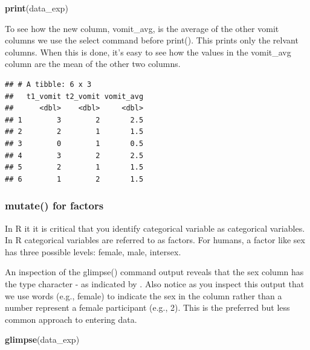 \documentclass[
]{krantz}
\makeatletter
\newenvironment{Shaded}{\begin{snugshade}}{\end{snugshade}}
\newcommand{\KeywordTok}[1]{\textcolor[rgb]{0.27,0.27,0.27}{\textbf{#1}}}
\newcommand{\NormalTok}[1]{#1}
\newcommand{\OperatorTok}[1]{\textcolor[rgb]{0.43,0.43,0.43}{\textbf{#1}}}
\newcommand{\StringTok}[1]{\textcolor[rgb]{0.5,0.5,0.5}{#1}}
\newenvironment{kframe}{%
\medskip{}
\setlength{\fboxsep}{.8em}
 \def\at@end@of@kframe{}%
 \ifinner\ifhmode%
  \def\at@end@of@kframe{\end{minipage}}%
  \begin{minipage}{\columnwidth}%
 \fi\fi%
 \def\FrameCommand##1{\hskip\@totalleftmargin \hskip-\fboxsep
 \colorbox{shadecolor}{##1}\hskip-\fboxsep
     \hskip-\linewidth \hskip-\@totalleftmargin \hskip\columnwidth}%
 \MakeFramed {\advance\hsize-\width
   \@totalleftmargin\z@ \linewidth\hsize
   \@setminipage}}%
 {\par\unskip\endMakeFramed%
 \at@end@of@kframe}
\renewenvironment{Shaded}{\begin{kframe}}{\end{kframe}}
\makeatother
\begin{document}
\begin{Shaded}
\begin{Highlighting}[]
\KeywordTok{print}\NormalTok{(data_exp)}
\end{Highlighting}
\end{Shaded}

To see how the new column, vomit\_avg, is the average of the other vomit columns we use the select command before print(). This prints only the relvant columns. When this is done, it's easy to see how the values in the vomit\_avg column are the mean of the other two columns.

\begin{Shaded}
\end{Shaded}

\begin{verbatim}
## # A tibble: 6 x 3
##   t1_vomit t2_vomit vomit_avg
##      <dbl>    <dbl>     <dbl>
## 1        3        2       2.5
## 2        2        1       1.5
## 3        0        1       0.5
## 4        3        2       2.5
## 5        2        1       1.5
## 6        1        2       1.5
\end{verbatim}

\hypertarget{mutate-for-factors}{%
\subsubsection{mutate() for factors}\label{mutate-for-factors}}

In R it it is critical that you identify categorical variable as categorical variables. In R categorical variables are referred to as factors. For humans, a factor like sex has three possible levels: female, male, intersex.

An inspection of the glimpse() command output reveals that the sex column has the type character - as indicated by . Also notice as you inspect this output that we use words (e.g., female) to indicate the sex in the column rather than a number represent a female participant (e.g., 2). This is the preferred but less common approach to entering data.

\begin{Shaded}
\begin{Highlighting}[]
\KeywordTok{glimpse}\NormalTok{(data_exp)}
\end{Highlighting}
\end{Shaded}
\end{document}
